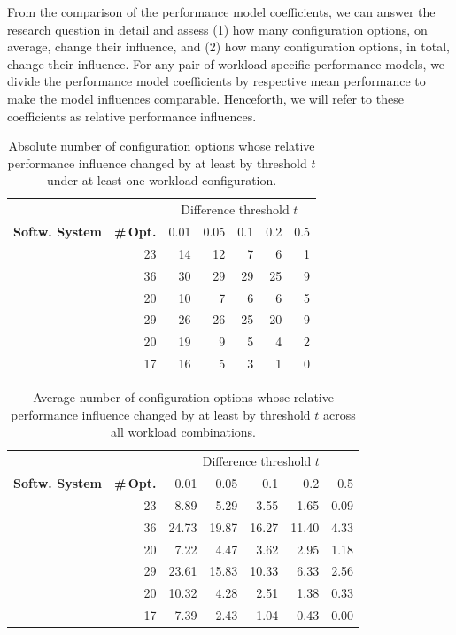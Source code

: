 {\color{blue}
From the comparison of the performance model coefficients, we can answer the research question in detail and assess (1) how many configuration options, on average, change their influence, and (2) how many configuration options, in total, change their influence. For any pair of workload-specific performance models, we divide the performance model coefficients by respective mean performance to make the model influences comparable. Henceforth, we will refer to these coefficients as relative performance influences.}


\begin{table}
	\centering
	\caption{Absolute number of configuration options whose relative performance influence changed by at least by threshold $t$ under at least one workload configuration.}
	\begin{tabular}{lr|rrrrr}
		\toprule
		& &  \multicolumn{5}{c}{Difference threshold $t$} \\
		\textbf{Softw. System} & \textbf{\#\,Opt.} & 0.01 &  0.05 &  0.1 &  0.2 &  0.5 \\
		\midrule
		\dconvert & 23 &    14 &    12 &    7 &    6 &    1 \\
		\jumper & 36 &   30 &    29 &   29 &   25 &    9 \\
		\batik &  20 &  10 &     7 &    6 &    6 &    5 \\
		\kanzi & 29 &   26 &    26 &   25 &   20 &    9 \\
		\jadx & 20 &   19 &     9 &    5 &    4 &    2 \\
		\htwo & 17 &   16 &     5 &    3 &    1 &    0 \\
		\bottomrule
	\end{tabular}
	\label{tab:total_changes}
\end{table}
\begin{table}
	\caption{Average number of configuration options whose relative performance influence changed by at least by threshold $t$ across all workload combinations.}
	\begin{tabular}{lr|rrrrr}
		\toprule
		& & \multicolumn{5}{c}{Difference threshold $t$} \\
		\textbf{Softw. System} & \textbf{\#\,Opt.} & 0.01 &  0.05 &  0.1 &  0.2 &  0.5 \\
		\midrule
		\dconvert & 23 &  8.89 &  5.29 &  3.55 &  1.65 & 0.09 \\
		\jumper & 36 & 24.73 & 19.87 & 16.27 & 11.40 & 4.33 \\
		\batik & 20 &  7.22 &  4.47 &  3.62 &  2.95 & 1.18 \\
		\kanzi & 29 & 23.61 & 15.83 & 10.33 &  6.33 & 2.56 \\
		\jadx & 20 & 10.32 &  4.28 &  2.51 &  1.38 & 0.33 \\
		\htwo & 17 & 7.39 &  2.43 &  1.04 &  0.43 & 0.00 \\
		\bottomrule
	\end{tabular}
	\label{tab:average_changes}
\end{table}

